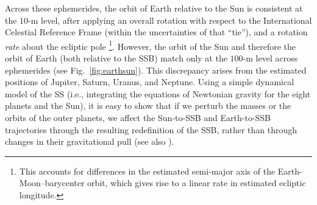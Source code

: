 \documentclass[reprint,
 amsmath,amssymb,
 aps,prd,floatfix,
]{revtex4-1}
\begin{document}
Across these ephemerides, the orbit of Earth relative to the Sun is consistent at the $10$-m level, after applying an overall rotation with respect to the International Celestial Reference Frame (within the uncertainties of that ``tie''), and a rotation \emph{rate} about the ecliptic pole \footnote{\label{footnote:rate}This accounts for differences in the estimated semi-major axis of the Earth-Moon--barycenter orbit, which gives rise to a linear rate in estimated ecliptic longitude.}.
However, the orbit of the Sun and therefore the orbit of Earth (both relative to the SSB) match only at the $100$-m level across ephemerides (see Fig.\ \ref{fig:earthsun}). This discrepancy arises from the estimated positions of Jupiter, Saturn, Uranus, and Neptune. Using a simple dynamical model of the SS (i.e., integrating the equations of Newtonian gravity for the eight planets and the Sun), it is easy to show that if we perturb the masses or the orbits of the outer planets, we affect the Sun-to-SSB and Earth-to-SSB trajectories through the resulting redefinition of the SSB, rather than through changes in their gravitational pull (see also \cite{2019MNRAS.489.5573G}).
%
\end{document}
